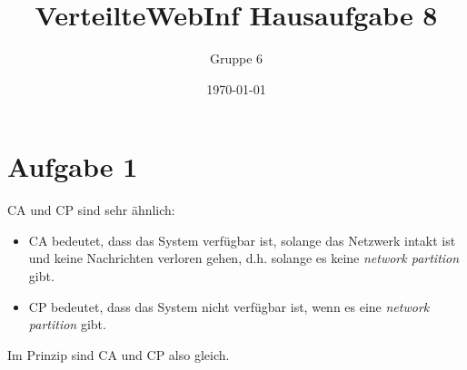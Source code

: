 \documentclass[a4paper]{article}
\author{Gruppe 6}
\title{\textbf{VerteilteWebInf Hausaufgabe 8}}
\date{\today}
\begin{document}
\maketitle

\section*{Aufgabe 1}
CA und CP sind sehr ähnlich:
\begin{itemize}
\item CA bedeutet, dass das System verfügbar ist, solange das Netzwerk intakt ist und keine Nachrichten verloren gehen, d.h. solange es keine \emph{network partition} gibt.
\item CP bedeutet, dass das System nicht verfügbar ist, wenn es eine \emph{network partition} gibt.
\end{itemize}
Im Prinzip sind CA und CP also gleich.
\end{document}
